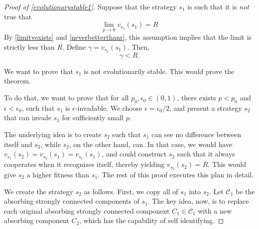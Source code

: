 \documentclass[11pt]{amsart}
\theoremstyle{definition}
\theoremstyle{remark}
\begin{document}
    \begin{proof}[Proof of \cref{evolutionarystable1}]
      Suppose that the strategy $s_1$ is such that it is \textit{not} true that \begin{equation*}
        \lim_{p \to 0 } v_{s_1}(s_1) = R
      \end{equation*}
      By \cref{limitvexists} and \cref{neverbetterthanr}, this assumption implies that the limit is strictly less than $R$. Define $\gamma = v_{s_1}(s_1)$. Then,
      \begin{equation*}
        \gamma < R.
      \end{equation*}
      
      We want to prove that $s_1$ is not evolutionarily stable. This would prove the theorem.
      
      To do that, we want to prove that for all $p_0, \epsilon_0 \in (0,1)$, there exists $p < p_0$ and $\epsilon < \epsilon_0$, such that $s_1$ is $\epsilon$-invadable. We choose $\epsilon = \epsilon_0 / 2$, and present a strategy $s_2$ that can invade $s_1$ for sufficiently small $p$.


      The underlying idea is to create $s_2$ such that $s_1$ can see no difference between itself and $s_2$, while $s_2$, on the other hand, can. In that case, we would have $v_{s_1}(s_2) = v_{s_2}(s_1) = v_{s_1}(s_1)$, and could construct $s_2$ such that it always cooperates when it recognizes itself, thereby yielding $v_{s_2}(s_2) = R$. This would give $s_2$ a higher fitness than $s_1$. The rest of this proof executes this plan in detail.

      We create the strategy $s_2$ as follows. First, we copy all of $s_1$ into $s_2$. Let $\mathcal{C}_1$ be the absorbing strongly connected components of $s_1$. The key idea, now, is to replace each original absorbing strongly connected component $C_1 \in \mathcal{C}_1$ with a new absorbing component $C_2$, which has the capability of self identifying.
      

\end{proof}
\end{document}
